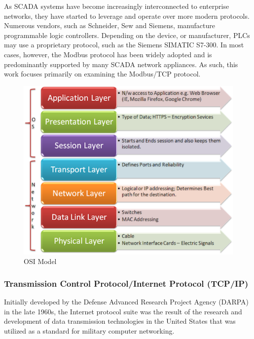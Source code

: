 \documentclass[11pt,]{article}
\begin{document}
As SCADA systems have become increasingly interconnected to enterprise
networks, they have started to leverage and operate over more modern
protocols. Numerous vendors, such as Schneider, Sew and Siemens,
manufacture programmable logic controllers. Depending on the device, or
manufacturer, PLCs may use a proprietary protocol, such as the Siemens
SIMATIC S7-300. In most cases, however, the Modbus protocol has been
widely adopted and is predominantly supported by many SCADA network
appliances. As such, this work focuses primarily on examining the
Modbus/TCP protocol.

\begin{figure}[bottom]

{\centering \includegraphics{thesis_files/figure-latex/unnamed-chunk-5-1} 

}

\caption{OSI Model}\label{fig:unnamed-chunk-5}
\end{figure}

\clearpage

\subsubsection{Transmission Control Protocol/Internet Protocol
(TCP/IP)}\label{transmission-control-protocolinternet-protocol-tcpip}

Initially developed by the Defense Advanced Research Project Agency
(DARPA) in the late 1960s, the Internet protocol suite was the result of
the research and development of data transmission technologies in the
United States that was utilized as a standard for military computer
networking.
\end{document}
